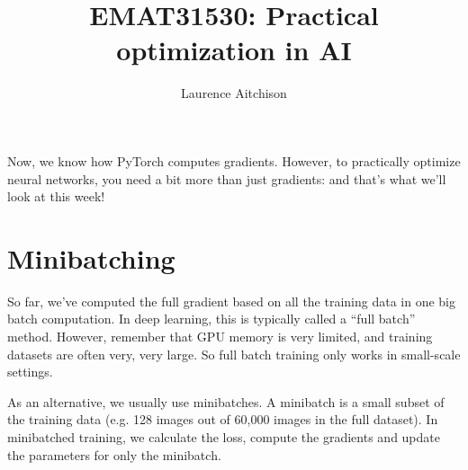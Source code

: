 \documentclass{article}
\title{EMAT31530: Practical optimization in AI}
\author{Laurence Aitchison}
\date{}
\newcommand{\0}{\mathbf{0}}
\begin{document}
\maketitle

Now, we know how PyTorch computes gradients.
However, to practically optimize neural networks, you need a bit more than just gradients: and that's what we'll look at this week!

\section{Minibatching}
So far, we've computed the full gradient based on all the training data in one big batch computation.
In deep learning, this is typically called a ``full batch'' method.
However, remember that GPU memory is very limited, and training datasets are often very, very large.
So full batch training only works in small-scale settings.

As an alternative, we usually use minibatches.
A minibatch is a small subset of the training data (e.g. 128 images out of 60,000 images in the full dataset).
In minibatched training, we calculate the loss, compute the gradients and update the parameters for only the minibatch.
\end{document}
